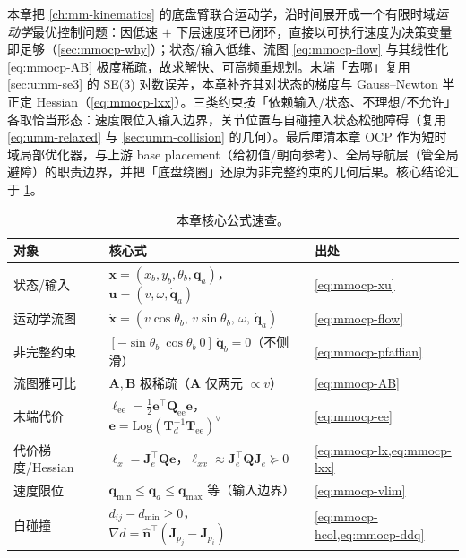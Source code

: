 本章把 \cref{ch:mm-kinematics} 的底盘臂联合运动学，沿时间展开成一个有限时域\emph{运动学}最优控制问题：因低速 $+$ 下层速度环已闭环，直接以可执行速度为决策变量即足够（\cref{sec:mmocp-why}）；状态/输入低维、流图 \cref{eq:mmocp-flow} 与其线性化 \cref{eq:mmocp-AB} 极度稀疏，故求解快、可高频重规划。末端「去哪」复用 \cref{sec:umm-se3} 的 SE(3) 对数误差，本章补齐其对状态的梯度与 Gauss--Newton 半正定 Hessian（\cref{eq:mmocp-lxx}）。三类约束按「依赖输入/状态、不理想/不允许」各取恰当形态：速度限位入输入边界，关节位置与自碰撞入状态松弛障碍（复用 \cref{eq:umm-relaxed} 与 \cref{sec:umm-collision} 的几何）。最后厘清本章 OCP 作为短时域局部优化器，与上游 base placement（给初值/朝向参考）、全局导航层（管全局避障）的职责边界，并把「底盘绕圈」还原为非完整约束的几何后果。核心结论汇于 \cref{tab:mmocp-summary}。

\begin{table}[H]\centering\small
\caption{本章核心公式速查。}
\label{tab:mmocp-summary}
\begin{tabular}{lll}
\toprule
对象 & 核心式 & 出处 \\
\midrule
状态/输入 & $\mathbf x=(x_b,y_b,\theta_b,\mathbf q_a)$，$\mathbf u=(v,\omega,\dot{\mathbf q}_a)$ & \cref{eq:mmocp-xu} \\
运动学流图 & $\dot{\mathbf x}=(v\cos\theta_b,\,v\sin\theta_b,\,\omega,\,\dot{\mathbf q}_a)$ & \cref{eq:mmocp-flow} \\
非完整约束 & $[-\sin\theta_b\ \cos\theta_b\ 0]\,\dot{\mathbf q}_b=0$（不侧滑） & \cref{eq:mmocp-pfaffian} \\
流图雅可比 & $\mathbf A,\mathbf B$ 极稀疏（$\mathbf A$ 仅两元 $\propto v$） & \cref{eq:mmocp-AB} \\
末端代价 & $\ell_{\text{ee}}=\tfrac12\mathbf e^\top\mathbf Q_{\text{ee}}\mathbf e$，$\mathbf e=\mathrm{Log}(\mathbf T_d^{-1}\mathbf T_{\text{ee}})^\vee$ & \cref{eq:mmocp-ee} \\
代价梯度/Hessian & $\boldsymbol\ell_x=\mathbf J_e^\top\mathbf Q\mathbf e$，$\boldsymbol\ell_{xx}\approx\mathbf J_e^\top\mathbf Q\mathbf J_e\succeq0$ & \cref{eq:mmocp-lx,eq:mmocp-lxx} \\
速度限位 & $\dot{\mathbf q}_{\min}\le\dot{\mathbf q}_a\le\dot{\mathbf q}_{\max}$ 等（输入边界） & \cref{eq:mmocp-vlim} \\
自碰撞 & $d_{ij}-d_{\min}\ge0$，$\nabla d=\hat{\mathbf n}^\top(\mathbf J_{p_j}-\mathbf J_{p_i})$ & \cref{eq:mmocp-hcol,eq:mmocp-ddq} \\
\bottomrule
\end{tabular}
\end{table}

